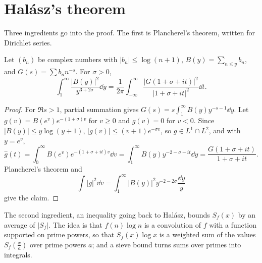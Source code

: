 \section{Halász's theorem}

Three ingredients go into the proof. The first is Plancherel's theorem, written for Dirichlet series.

\begin{lemma}\label{lem:plancherel}
Let $(b_n)$ be complex numbers with $|b_n|\le\log(n+1)$, $B(y)=\sum_{n\le y}b_n$, and $G(s)=\sum b_nn^{-s}$. For $\sigma>0$,
\[
\int_1^\infty\frac{|B(y)|^2}{y^{3+2\sigma}}\dd y=\frac1{2\pi}\int_{-\infty}^\infty\frac{|G(1+\sigma+it)|^2}{|1+\sigma+it|^2}\dd t.
\]
\end{lemma}
\begin{proof}
For $\Re s>1$, partial summation gives $G(s)=s\int_1^\infty B(y)y^{-s-1}\dd y$. Let $g(v)=B(e^v)e^{-(1+\sigma)v}$ for $v\ge0$ and $g(v)=0$ for $v<0$. Since $|B(y)|\le y\log(y+1)$, $|g(v)|\le(v+1)e^{-\sigma v}$, so $g\in L^1\cap L^2$, and with $y=e^v$,
\[
\hat g(t)=\int_0^\infty B(e^v)e^{-(1+\sigma+it)v}\dd v=\int_1^\infty B(y)y^{-2-\sigma-it}\dd y=\frac{G(1+\sigma+it)}{1+\sigma+it}.
\]
Plancherel's theorem and
\[
\int|g|^2\dd v=\int_1^\infty|B(y)|^2y^{-2-2\sigma}\frac{\dd y}y
\]
give the claim.
\end{proof}

The second ingredient, an inequality going back to Halász, bounds $S_f(x)$ by an average of $|S_f|$. The idea is that $f(n)\log n$ is a convolution of $f$ with a function supported on prime powers, so that $S_f(x)\log x$ is a weighted sum of the values $S_f(\frac xa)$ over prime powers $a$; and a sieve bound turns sums over primes into integrals.

